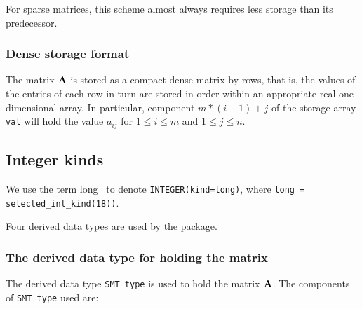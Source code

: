 \documentclass{galahad}
\begin{document}
For sparse matrices, this scheme almost always requires less storage than
its predecessor.

\subsubsection{Dense storage format}\label{dense}
The matrix ${\mathbf{A}}$ is stored as a compact
dense matrix by rows, that is, the values of the entries of each row in turn are
stored in order within an appropriate real one-dimensional array.
In particular,
component $m \ast (i-1) + j$ of the storage array {\tt val}
will hold the value $a_{ij}$
for $1 \leq i \leq m$ and $1 \leq j \leq n$.

\subsection{Integer kinds}\label{Integer kinds}
We use the term
long \integer\ to denote {\tt INTEGER\-(kind=long)}, where
{\tt long = selected\_int\_kind(18))}.





\galtypes
Four derived data types are used by the package.


\subsubsection{The derived data type for holding the matrix}\label{typeprob}
The derived data type {\tt SMT\_type} is used to hold the matrix ${\mathbf{A}}$.
The components of {\tt SMT\_type} used are:
\end{document}
